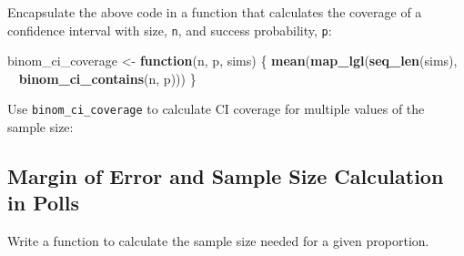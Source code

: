 \documentclass[]{book}
\newenvironment{Shaded}{\begin{snugshade}}{\end{snugshade}}
\newcommand{\CommentTok}[1]{\textcolor[rgb]{0.56,0.35,0.01}{\textit{#1}}}
\newcommand{\ControlFlowTok}[1]{\textcolor[rgb]{0.13,0.29,0.53}{\textbf{#1}}}
\newcommand{\DataTypeTok}[1]{\textcolor[rgb]{0.13,0.29,0.53}{#1}}
\newcommand{\KeywordTok}[1]{\textcolor[rgb]{0.13,0.29,0.53}{\textbf{#1}}}
\newcommand{\NormalTok}[1]{#1}
\newcommand{\OperatorTok}[1]{\textcolor[rgb]{0.81,0.36,0.00}{\textbf{#1}}}
\newcommand{\StringTok}[1]{\textcolor[rgb]{0.31,0.60,0.02}{#1}}
\theoremstyle{definition}
\theoremstyle{definition}
\theoremstyle{definition}
\theoremstyle{remark}
\begin{document}
Encapsulate the above code in a function that calculates the coverage of
a confidence interval with size, \texttt{n}, and success probability,
\texttt{p}:

\begin{Shaded}
\begin{Highlighting}[]
\NormalTok{binom_ci_coverage <-}\StringTok{ }\ControlFlowTok{function}\NormalTok{(n, p, sims) \{}
  \KeywordTok{mean}\NormalTok{(}\KeywordTok{map_lgl}\NormalTok{(}\KeywordTok{seq_len}\NormalTok{(sims), }\OperatorTok{~}\StringTok{ }\KeywordTok{binom_ci_contains}\NormalTok{(n, p)))}
\NormalTok{\}}
\end{Highlighting}
\end{Shaded}

Use \texttt{binom\_ci\_coverage} to calculate CI coverage for multiple
values of the sample size:

\begin{Shaded}
\end{Shaded}

\hypertarget{margin-of-error-and-sample-size-calculation-in-polls}{%
\subsection{Margin of Error and Sample Size Calculation in
Polls}\label{margin-of-error-and-sample-size-calculation-in-polls}}

Write a function to calculate the sample size needed for a given
proportion.
\end{document}
